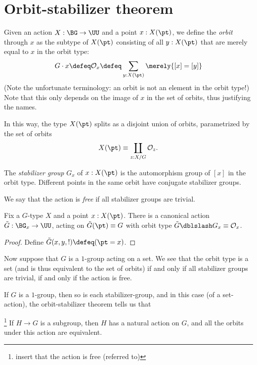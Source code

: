 \section{Orbit-stabilizer theorem}
\label{sec:orbit-stabilizer-theorem}

Given an action $X : \BG \to \UU$ and a point $x : X(\pt)$, we define
the \emph{orbit} through $x$ as the subtype of $X(\pt)$ consisting of
all $y : X(\pt)$ that are merely equal to $x$ in the orbit type:
\[
  G\cdot x \defeq \mathcal O_x \defeq \sum_{y : X(\pt)} \merely{[x] = [y]}
\]
(Note the unfortunate terminology: an orbit is not an element in the
orbit type!)
Note that this only depends on the image of $x$ in the set of orbits,
thus justifying the names.

In this way, the type $X(\pt)$ splits as a disjoint union of orbits,
parametrized by the set of orbits
\[
  X(\pt) \equiv \coprod_{z : X / G} \mathcal O_z.
\]

The \emph{stabilizer group} $G_x$ of $x : X(\pt)$ is the automorphism group of $[x]$ in the orbit type.
Different points in the same orbit have conjugate stabilizer groups.

We say that the action is \emph{free} if all stabilizer groups are trivial.

\begin{theorem}
  \label{thm:orbitstab}
  Fix a $G$-type $X$ and a point $x : X(\pt)$.
  There is a canonical action $\tilde G : \BG_x \to \UU$,
  acting on $\tilde G(\pt)\equiv G$
  with orbit type $\tilde G\dblslash G_x \equiv \mathcal O_x$.
\end{theorem}
\begin{proof}
  Define $\tilde G(x,y,!) \defeq (\pt = x)$.
\end{proof}

Now suppose that $G$ is a $1$-group acting on a set.
We see that the orbit type is a set
(and is thus equivalent to the set of orbits)
if and only if
all stabilizer groups are trivial,
\ie if and only if the action is free.

If $G$ is a $1$-group,
then so is each stabilizer-group,
and in this case (of a set-action),
the orbit-stabilizer theorem
tells us that

\begin{theorem}\footnote{insert that the action is free (referred to)}
\label{thm:lagrange}
  If $H \to G$ is a subgroup, then $H$ has a natural action on $G$,
  and all the orbits under this action are equivalent.
\end{theorem}

